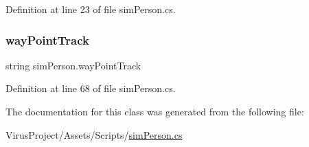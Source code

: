 Definition at line 23 of file sim\+Person.\+cs.

\hypertarget{classsim_person_af45d2902026e35903cebbe51f66caf30}{}\label{classsim_person_af45d2902026e35903cebbe51f66caf30} 
\subsubsection{\texorpdfstring{way\+Point\+Track}{wayPointTrack}}
{\footnotesize\ttfamily string sim\+Person.\+way\+Point\+Track}



Definition at line 68 of file sim\+Person.\+cs.



The documentation for this class was generated from the following file\+:\begin{DoxyCompactItemize}
\item 
Virus\+Project/\+Assets/\+Scripts/\hyperlink{sim_person_8cs}{sim\+Person.\+cs}\end{DoxyCompactItemize}
